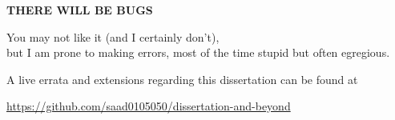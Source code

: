 
\newpage

\thispagestyle{plain}

\begin{center}
{\large\bf THERE WILL BE BUGS}
\vspace{1in}
\end{center}




\begin{center}
You may not like it (and I certainly don't), \\
but I am prone to making errors, 
most of the time stupid but often egregious. 

A live errata and extensions regarding this dissertation 
can be found at 

  \url{https://github.com/saad0105050/dissertation-and-beyond}
\end{center}

\newpage